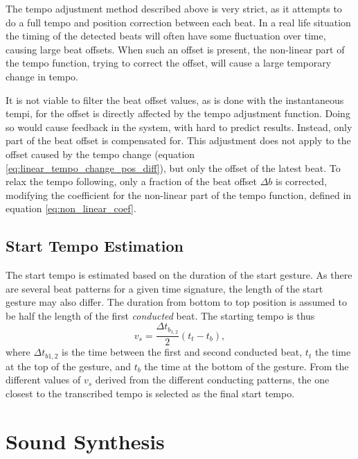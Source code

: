 The tempo adjustment method described above is very strict,
as it attempts to do a full tempo and position correction
between each beat.
In a real life situation
the timing of the detected beats will often have some
fluctuation over time,
causing large beat offsets.
When such an offset is present,
the non-linear part of the tempo function,
trying to correct the offset,
will cause a large temporary change in tempo.

It is not viable to filter the beat offset values,
as is done with the instantaneous tempi,
for the offset is directly affected by
the tempo adjustment function.
Doing so would cause feedback in the system,
with hard to predict results.
Instead, only part of the beat offset is compensated for.
This adjustment does not apply to
the offset caused by the tempo change
(equation \ref{eq:linear_tempo_change_pos_diff}),
but only the offset of the latest beat.
To relax the tempo following,
only a fraction of the beat offset $\Delta b$ is corrected,
modifying the coefficient for the non-linear 
part of the tempo function, defined in equation
\ref{eq:non_linear_coef}.

\section{Start Tempo Estimation}
\label{sec:meth:start_tempo_estimation}

The start tempo is estimated based on
the duration of the start gesture.
As there are several beat patterns for a given time signature,
the length of the start gesture may also differ.
The duration from bottom to top position is
assumed to be half the length of
the first \textit{conducted} beat.
The starting tempo is thus
\begin{equation}
v_s = \frac{\Delta t_{b_{1,2}}}{2} (t_t - t_b),
\end{equation}
where $\Delta t_{b1,2}$ is the
time between the first and second conducted beat,
$t_t$ the time at the top of the gesture,
and $t_b$ the time at the bottom of the gesture.
From the different values of $v_s$ derived from the
different conducting patterns,
the one closest to the transcribed tempo is selected
as the final start tempo.


\chapter{Sound Synthesis}
\label{chapter:sound_synthesis}


